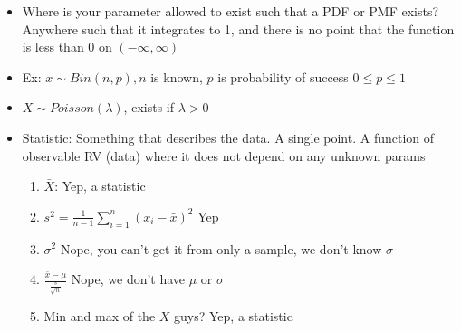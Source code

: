 \documentclass{article}
\begin{document}
\begin{itemize}
    \item Where is your parameter allowed to exist such that a PDF or PMF exists? Anywhere such that it integrates to 1, and there is no point that the function is less than 0 on $ (-\infty, \infty) $ 
    \item Ex: $ x \sim Bin(n, p), n $ is known,  $ p $ is probability of success  $ 0 \leq p \leq 1 $
    \item  $ X \sim Poisson(\lambda) $, exists if  $ \lambda > 0 $
    \item Statistic: Something that describes the data. A single point. A function of observable  RV (data) where it does not depend on any unknown params
      \begin{enumerate}
        \item $ \bar{X} $: Yep, a statistic
        \item $ s^2 = \frac{1}{n - 1} \sum_{i = 1}^{n} {(x_i - \bar{x})}^2$ Yep
        \item $ \sigma^2 $ Nope, you can't get it from only a sample, we don't know $ \sigma $
        \item $  \frac{\bar{x} - \mu}{\frac{s}{\sqrt{n}}} $ Nope, we don't have $ \mu $ or $ \sigma $
        \item Min and max of the $ X $ guys? Yep, a statistic
        
      \end{enumerate}
  \end{itemize}
 
\end{document}
